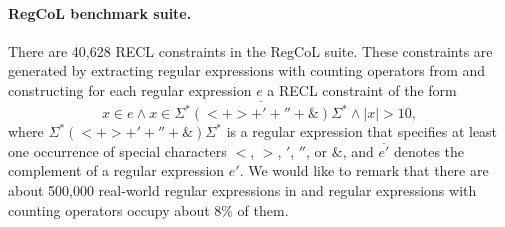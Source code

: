 \paragraph*{RegCoL benchmark suite.} There are 40,628 RECL constraints in the RegCoL suite.  These constraints are generated by extracting regular expressions with counting operators from \cite{regex_lingua_franca,redos_lenka} and constructing for each regular expression $e$ a RECL constraint of the form 
$$x \in e \wedge x \in \overline{\Sigma^*(<+ >+'+''+\&)\Sigma^*} \wedge |x| > 10,$$   
where $\Sigma^*(<+ >+'+''+\&)\Sigma^*$ is a regular expression that specifies at least one occurrence of special characters $<$, $>$, $'$, $''$, or $\&$, and $\overline{e'}$ denotes the complement of a regular expression $e'$. We would like to remark that there are about 500,000 real-world regular expressions in \cite{regex_lingua_franca,redos_lenka} and regular expressions with counting operators occupy about 8\% of them. 

